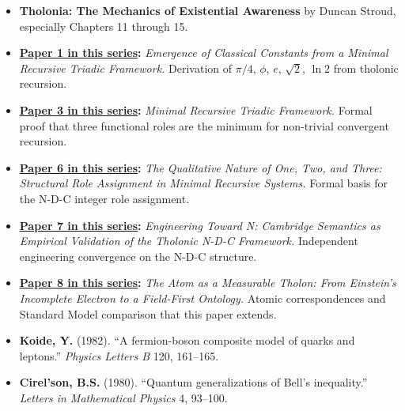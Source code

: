 \documentclass[
  11pt,
  letterpaper,
]{article}
\providecommand{\tightlist}{%
  \setlength{\itemsep}{0pt}\setlength{\parskip}{0pt}}
\begin{document}
\begin{itemize}
\tightlist
\item
  \textbf{Tholonia: The Mechanics of Existential Awareness} by Duncan
  Stroud, especially Chapters 11 through 15.
\item
  \textbf{\href{https://github.com/baardev/truevalue/blob/main/docnav/Research/papers/1_recursive-tholonic-five-constants/1_recursive-tholonic-five-constants.pdf}{Paper
  1 in this series}:} \emph{Emergence of Classical Constants from a
  Minimal Recursive Triadic Framework.} Derivation of \(\pi/4\),
  \(\phi\), \(e\), \(\sqrt{2}\), \(\ln 2\) from tholonic recursion.
\item
  \textbf{\href{https://github.com/baardev/truevalue/blob/main/docnav/Research/papers/3_minimal-recursive-triadic-framework/3_minimal-recursive-triadic-framework.pdf}{Paper
  3 in this series}:} \emph{Minimal Recursive Triadic Framework.} Formal
  proof that three functional roles are the minimum for non-trivial
  convergent recursion.
\item
  \textbf{\href{https://github.com/baardev/truevalue/blob/main/docnav/Research/papers/6_qualitative-nature-integers-triadic-roles/6_qualitative-nature-integers-triadic-roles.pdf}{Paper
  6 in this series}:} \emph{The Qualitative Nature of One, Two, and
  Three: Structural Role Assignment in Minimal Recursive Systems.}
  Formal basis for the N-D-C integer role assignment.
\item
  \textbf{\href{https://github.com/baardev/truevalue/blob/main/docnav/Research/papers/7_cambridge-semantics-tholonic-framework/7_cambridge-semantics-tholonic-framework.pdf}{Paper
  7 in this series}:} \emph{Engineering Toward N: Cambridge Semantics as
  Empirical Validation of the Tholonic N-D-C Framework.} Independent
  engineering convergence on the N-D-C structure.
\item
  \textbf{\href{https://github.com/baardev/truevalue/blob/main/docnav/Research/papers/8_atom-as-tholon-measurable-phenomena/8_atom-as-tholon-measurable-phenomena.pdf}{Paper
  8 in this series}:} \emph{The Atom as a Measurable Tholon: From
  Einstein's Incomplete Electron to a Field-First Ontology.} Atomic
  correspondences and Standard Model comparison that this paper extends.
\item
  \textbf{Koide, Y.} (1982). ``A fermion-boson composite model of quarks
  and leptons.'' \emph{Physics Letters B} 120, 161--165.
\item
  \textbf{Cirel'son, B.S.} (1980). ``Quantum generalizations of Bell's
  inequality.'' \emph{Letters in Mathematical Physics} 4, 93--100.

\end{itemize}
\end{document}
